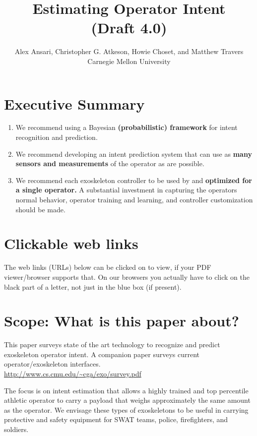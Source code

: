\documentclass[letterpaper,12pt,fullpage]{article}
\begin{document}
\title{Estimating Operator Intent\\
(Draft 4.0)}

\author{Alex Ansari, Christopher G. Atkeson, Howie Choset, and Matthew Travers\\
Carnegie Mellon University}

\maketitle

\section{Executive Summary}

\begin{enumerate}
\item
We recommend using a Bayesian {\bf (probabilistic) framework}
for intent recognition and prediction.
\item
We recommend developing an intent prediction system that can use
as {\bf many sensors and measurements} of the operator as are possible.
\item
We recommend each exoskeleton controller
to be used by and {\bf optimized for a single operator.}
A substantial investment in capturing the operators normal behavior,
operator training and learning, and controller customization should be made.
\end{enumerate}

\section{Clickable web links}

The web links (URLs) below can be clicked on to view, if your PDF viewer/browser supports that. On our browsers you actually have to click on the black
part of a letter, not just in the blue box (if present).

\section{Scope: What is this paper about?}

This paper surveys state of the art technology to recognize
and predict exoskeleton
operator intent.
A companion paper surveys current operator/exoskeleton interfaces.\\
\url{http://www.cs.cmu.edu/~cga/exo/survey.pdf}

The focus is on intent estimation that allows a
highly trained and top percentile athletic 
operator to carry a payload that weighs approximately the same amount
as the operator. We envisage these types of exoskeletons to be useful
in carrying protective and safety equipment for SWAT teams, police,
firefighters, and soldiers. 
\end{document}
